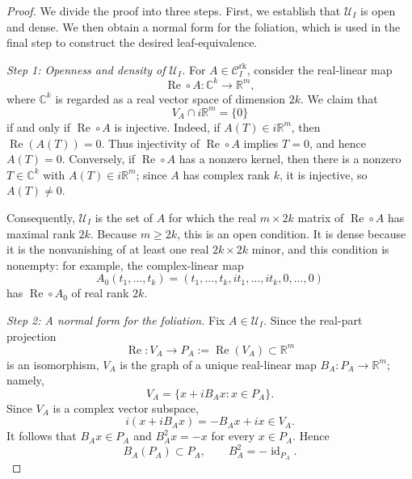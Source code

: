 \documentclass[11pt]{amsart}
\theoremstyle{definition}
\theoremstyle{remark}
\newcommand{\C}{\mathbb{C}}
\newcommand{\R}{\mathbb{R}}
\begin{document}
\begin{proof}
	We divide the proof into three steps. First, we establish that $\mathcal U_I$ is open and dense. We then obtain a normal form for the foliation, which is used in the final step to construct the desired leaf-equivalence.

	\smallskip
	\noindent\emph{Step 1: Openness and density of $\mathcal U_I$.}
	For $A\in\mathcal C_I^{\mathrm{rk}}$, consider the real-linear map
	\[
		\operatorname{Re}\circ A:\C^k\longrightarrow\R^m,
	\]
	where $\C^k$ is regarded as a real vector space of dimension $2k$.
	We claim that
	\[
		V_A\cap i\R^m=\{0\}
	\]
	if and only if $\operatorname{Re}\circ A$ is injective.
	Indeed, if $A(T)\in i\R^m$, then $\operatorname{Re}(A(T))=0$.
	Thus injectivity of $\operatorname{Re}\circ A$ implies $T=0$, and hence $A(T)=0$.
	Conversely, if $\operatorname{Re}\circ A$ has a nonzero kernel, then there is a nonzero $T\in\C^k$ with $A(T)\in i\R^m$; since $A$ has complex rank $k$, it is injective, so $A(T)\neq0$.

	Consequently, $\mathcal U_I$ is the set of $A$ for which the real $m\times 2k$ matrix of $\operatorname{Re}\circ A$ has maximal rank $2k$.
	Because $m\geq2k$, this is an open condition.
	It is dense because it is the nonvanishing of at least one real $2k\times2k$ minor, and this condition is nonempty: for example, the complex-linear map
	\[
		A_0(t_1,\dots,t_k) =(t_1,\dots,t_k,it_1,\dots,it_k,0,\dots,0)
	\]
	has $\operatorname{Re}\circ A_0$ of real rank $2k$.

	\smallskip
	\noindent\emph{Step 2: A normal form for the foliation.}
Fix $A\in\mathcal U_I$. Since the real-part projection
\[
    \operatorname{Re}:V_A\longrightarrow
    P_A:=\operatorname{Re}(V_A)\subset\R^m
\]
is an isomorphism, $V_A$ is the graph of a unique real-linear map
$B_A:P_A\to\R^m$; namely,
\[
    V_A=\{x+iB_Ax:x\in P_A\}.
\]
Since $V_A$ is a complex vector subspace,
\[
    i(x+iB_Ax)=-B_Ax+ix\in V_A.
\]
It follows that $B_Ax\in P_A$ and $B_A^2x=-x$ for every $x\in P_A$.
Hence
\[
    B_A(P_A)\subset P_A,
    \qquad
    B_A^2=-\operatorname{id}_{P_A}.
\]


\end{proof}
\end{document}
